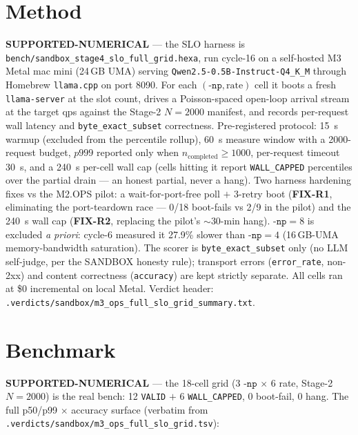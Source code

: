 \documentclass[11pt,a4paper]{article}
\begin{document}
\section{Method}
\label{sec:method}
\textcolor{green!50!black}{\textbf{SUPPORTED-NUMERICAL}} --- the SLO harness is
\texttt{bench/sandbox\_stage4\_slo\_full\_grid.hexa}, run cycle-16 on a
self-hosted M3 Metal mac mini (24\,GB UMA) serving
\texttt{Qwen2.5-0.5B-Instruct-Q4\_K\_M} \citep{qwen25} through Homebrew
\texttt{llama.cpp} \citep{llamacpp} on port 8090. For each
\((\texttt{-np}, \text{rate})\) cell it boots a fresh \texttt{llama-server} at
the slot count, drives a Poisson-spaced open-loop arrival stream at the target
qps against the Stage-2 \(N{=}2000\) manifest, and records per-request wall
latency and \texttt{byte\_exact\_subset} correctness. Pre-registered protocol:
\SI{15}{\second} warmup (excluded from the percentile rollup),
\SI{60}{\second} measure window with a 2000-request budget, \(p999\) reported
only when \(n_{\text{completed}}\ge 1000\), per-request timeout \SI{30}{\second},
and a \SI{240}{\second} per-cell wall cap (cells hitting it report
\texttt{WALL\_CAPPED} percentiles over the partial drain --- an honest partial,
never a hang). Two harness hardening fixes vs the M2.OPS pilot: a wait-for-port-free
poll \(+\) 3-retry boot (\textbf{FIX-R1}, eliminating the port-teardown race ---
0/18 boot-fails vs 2/9 in the pilot) and the \SI{240}{\second} wall cap
(\textbf{FIX-R2}, replacing the pilot's \(\sim\)30-min hang). \(\texttt{-np}{=}8\)
is excluded \emph{a priori}: cycle-6 measured it 27.9\% slower than
\(\texttt{-np}{=}4\) (16\,GB-UMA memory-bandwidth saturation). The scorer is
\texttt{byte\_exact\_subset} only (no LLM self-judge, per the SANDBOX honesty
rule); transport errors (\texttt{error\_rate}, non-2xx) and content correctness
(\texttt{accuracy}) are kept strictly separate. All cells ran at \$0 incremental
on local Metal. Verdict header:
\texttt{.verdicts/sandbox/m3\_ops\_full\_slo\_grid\_summary.txt}.

\section{Benchmark}
\label{sec:benchmark}
\textcolor{green!50!black}{\textbf{SUPPORTED-NUMERICAL}} --- the 18-cell grid
(3 \(\texttt{-np}\) \(\times\) 6 rate, Stage-2 \(N{=}2000\)) is the real bench:
12 \texttt{VALID} \(+\) 6 \texttt{WALL\_CAPPED}, 0 boot-fail, 0 hang. The full
p50/p99 \(\times\) accuracy surface (verbatim from
\texttt{.verdicts/sandbox/m3\_ops\_full\_slo\_grid.tsv}):
\end{document}
